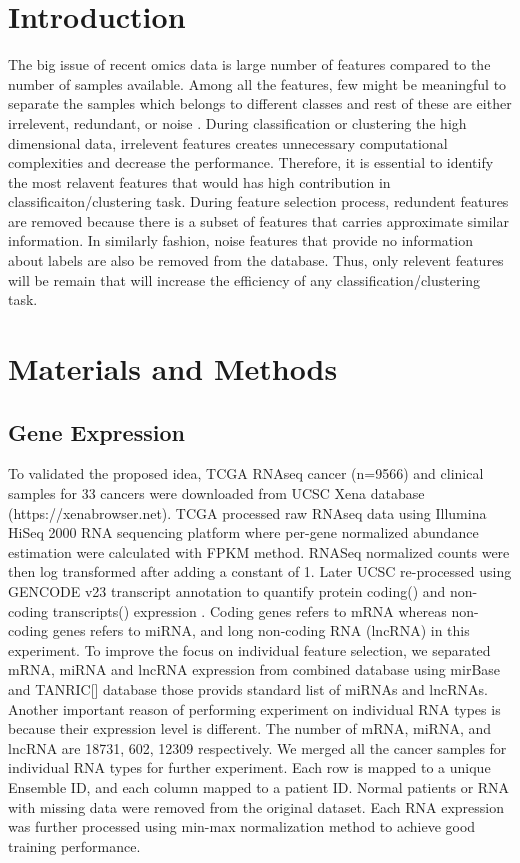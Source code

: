 \documentclass{bioinfo}
\begin{document}
\section{Introduction}
The big issue of recent omics data is large number of features compared to the number of samples available. Among all the features, few might be meaningful to separate the samples which belongs to different classes and rest of these are either irrelevent, redundant, or noise \citep{pirgazi2019efficient}. During classification or clustering the high dimensional data, irrelevent features creates unnecessary computational complexities and decrease the performance. Therefore, it is essential to identify the most relavent features that would has high contribution in classificaiton/clustering task. During feature selection process, redundent features are removed because there is a subset of features that carries approximate similar information. In similarly fashion, noise features that provide no information about labels are also be removed from the database. Thus, only relevent features will be remain that will increase the efficiency of any classification/clustering task. 
\section{Materials and Methods}
\subsection{Gene Expression}
To validated the proposed idea, TCGA RNAseq cancer (n=9566) and clinical samples for 33 cancers were downloaded from UCSC Xena database (https://xenabrowser.net). TCGA processed raw RNAseq data using Illumina HiSeq 2000 RNA sequencing platform where per-gene normalized abundance estimation were calculated with FPKM method. RNASeq normalized counts were then log transformed after adding a constant of 1.  Later UCSC re-processed using GENCODE v23 transcript annotation to quantify protein coding() and non-coding transcripts() expression \cite{harrow2006gencode}. Coding genes refers to mRNA whereas non-coding genes refers to miRNA, and long non-coding RNA (lncRNA) in this experiment. To improve the focus on individual feature selection, we separated mRNA, miRNA and lncRNA expression from combined database using mirBase and TANRIC[] database those provids standard list of miRNAs and lncRNAs. Another important reason of performing experiment on individual RNA types is because their expression level is different. The number of mRNA, miRNA, and lncRNA are 18731, 602, 12309 respectively. We merged all the cancer samples for individual RNA types for further experiment. Each row is mapped to a unique Ensemble ID, and each column mapped to a patient ID. Normal patients or RNA with missing data were removed from the original dataset. Each RNA expression was further processed using min-max normalization method to achieve good training performance. 
\end{document}
